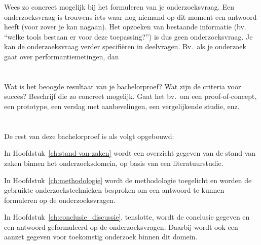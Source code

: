 Wees zo concreet mogelijk bij het formuleren van je onderzoeksvraag. Een onderzoeksvraag is trouwens iets waar nog niemand op dit moment een antwoord heeft (voor zover je kan nagaan). Het opzoeken van bestaande informatie (bv. ``welke tools bestaan er voor deze toepassing?'') is dus geen onderzoeksvraag. Je kan de onderzoeksvraag verder specifiëren in deelvragen. Bv.~als je onderzoek gaat over performantiemetingen, dan 

\section{}%
\label{sec:onderzoeksdoelstelling}

Wat is het beoogde resultaat van je bachelorproef? Wat zijn de criteria voor succes? Beschrijf die zo concreet mogelijk. Gaat het bv.\ om een proof-of-concept, een prototype, een verslag met aanbevelingen, een vergelijkende studie, enz.

\section{}%
\label{sec:opzet-bachelorproef}


De rest van deze bachelorproef is als volgt opgebouwd:

In Hoofdstuk~\ref{ch:stand-van-zaken} wordt een overzicht gegeven van de stand van zaken binnen het onderzoeksdomein, op basis van een literatuurstudie.

In Hoofdstuk~\ref{ch:methodologie} wordt de methodologie toegelicht en worden de gebruikte onderzoekstechnieken besproken om een antwoord te kunnen formuleren op de onderzoeksvragen.


In Hoofdstuk~\ref{ch:conclusie_discussie}, tenslotte, wordt de conclusie gegeven en een antwoord geformuleerd op de onderzoeksvragen. Daarbij wordt ook een aanzet gegeven voor toekomstig onderzoek binnen dit domein.